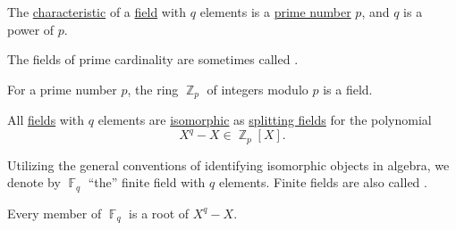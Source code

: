 \begin{theorem}\label{thm:finite_fields}
  \hfill
  \begin{thmenum}
     The \hyperref[def:ring_characteristic]{characteristic} of a \hyperref[def:field]{field} with \( q \) elements is a \hyperref[def:prime_number]{prime number} \( p \), and \( q \) is a power of \( p \).

    The fields of prime cardinality are sometimes called .

     For a prime number \( p \), the ring \hyperref[def:ring_of_integers_modulo]{\( \BbbZ_p \)} of integers modulo \( p \) is a field.

     All \hyperref[def:field]{fields} with \( q \) elements are \hyperref[def:field/homomorphism]{isomorphic} as \hyperref[def:splitting_field]{splitting fields} for the polynomial
    \begin{equation*}
      X^q - X \in \BbbZ_p[X].
    \end{equation*}

    Utilizing the general conventions of identifying isomorphic objects in algebra, we denote by \( \BbbF_q \) \enquote{the} finite field with \( q \) elements. Finite fields are also called .

    Every member of \( \BbbF_q \) is a root of \( X^q - X \).
  \end{thmenum}
\end{theorem}
